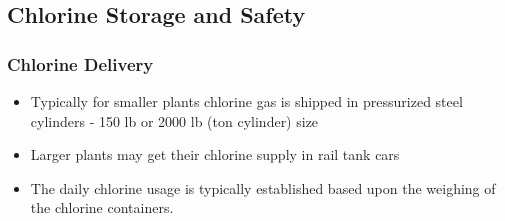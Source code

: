 \documentclass{article}
\begin{document}
\subsection{Chlorine Storage and Safety}


\subsubsection{Chlorine Delivery}

\begin{itemize}
\item Typically for smaller plants chlorine gas is shipped in  pressurized steel cylinders - 150 lb or 2000 lb (ton cylinder) size
\item Larger plants may get their chlorine supply in rail tank cars
\item The daily chlorine usage is typically established based upon the weighing of the chlorine containers.
\end{itemize}
\end{document}
